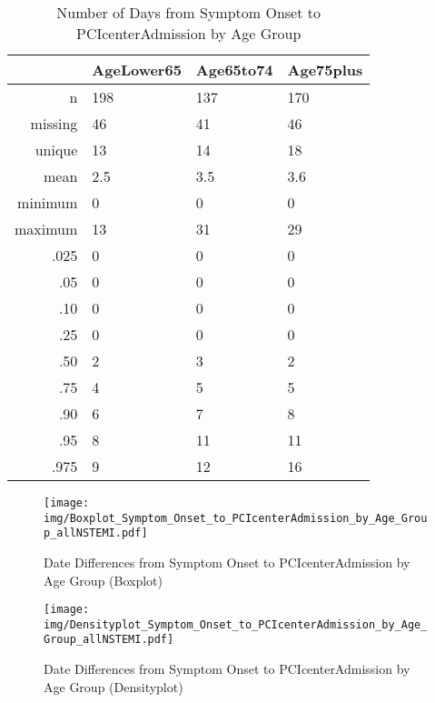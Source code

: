 \documentclass[a4paper]{report}
\begin{document}
\begin{itemize}
{\clearpage

\begin{table}[ht]
\centering
\begin{tabular}{rlll}
  \toprule
 & AgeLower65 & Age65to74 & Age75plus \\ 
  \midrule
n & 198 & 137 & 170 \\ 
  missing & 46 & 41 & 46 \\ 
  unique & 13 & 14 & 18 \\ 
  mean & 2.5 & 3.5 & 3.6 \\ 
  minimum & 0 & 0 & 0 \\ 
  maximum & 13 & 31 & 29 \\ 
  .025 & 0 & 0 & 0 \\ 
  .05 & 0 & 0 & 0 \\ 
  .10 & 0 & 0 & 0 \\ 
  .25 & 0 & 0 & 0 \\ 
  .50 & 2 & 3 & 2 \\ 
  .75 & 4 & 5 & 5 \\ 
  .90 & 6 & 7 & 8 \\ 
  .95 & 8 & 11 & 11 \\ 
  .975 & 9 & 12 & 16 \\ 
   \bottomrule
\end{tabular}
\caption{Number of Days from Symptom Onset to PCIcenterAdmission by Age Group} 
\end{table}
\begin{figure}
  \centering
  \caption{Date Differences from Symptom Onset to PCIcenterAdmission by Age Group (Boxplot)}
  \label{Boxplot: Date Differences from Symptom Onset to PCIcenterAdmission by Age Group}
\texttt{[image: img/Boxplot\_Symptom\_Onset\_to\_PCIcenterAdmission\_by\_Age\_Group\_allNSTEMI.pdf]}\end{figure}


\begin{figure}
  \centering
  \caption{Date Differences from Symptom Onset to PCIcenterAdmission by Age Group (Densityplot)}
  \label{Density: Date Differences from Symptom Onset to PCIcenterAdmission by Age Group}
\texttt{[image: img/Densityplot\_Symptom\_Onset\_to\_PCIcenterAdmission\_by\_Age\_Group\_allNSTEMI.pdf]}\end{figure}


\clearpage

}
\end{itemize}
\end{document}
